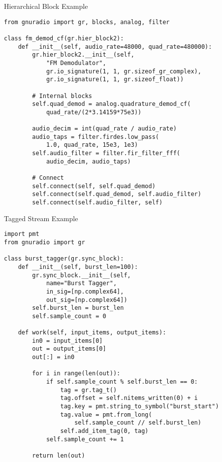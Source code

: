 \documentclass[aspectratio=169,11pt]{beamer}
\begin{document}
\begin{frame}[fragile]{Hierarchical Block Example}
\begin{verbatim}
from gnuradio import gr, blocks, analog, filter

class fm_demod_cf(gr.hier_block2):
    def __init__(self, audio_rate=48000, quad_rate=480000):
        gr.hier_block2.__init__(self,
            "FM Demodulator",
            gr.io_signature(1, 1, gr.sizeof_gr_complex),
            gr.io_signature(1, 1, gr.sizeof_float))
        
        # Internal blocks
        self.quad_demod = analog.quadrature_demod_cf(
            quad_rate/(2*3.14159*75e3))
        
        audio_decim = int(quad_rate / audio_rate)
        audio_taps = filter.firdes.low_pass(
            1.0, quad_rate, 15e3, 1e3)
        self.audio_filter = filter.fir_filter_fff(
            audio_decim, audio_taps)
        
        # Connect
        self.connect(self, self.quad_demod)
        self.connect(self.quad_demod, self.audio_filter)
        self.connect(self.audio_filter, self)
\end{verbatim}
\end{frame}

\begin{frame}[fragile]{Tagged Stream Example}
\begin{verbatim}
import pmt
from gnuradio import gr

class burst_tagger(gr.sync_block):
    def __init__(self, burst_len=100):
        gr.sync_block.__init__(self,
            name="Burst Tagger",
            in_sig=[np.complex64],
            out_sig=[np.complex64])
        self.burst_len = burst_len
        self.sample_count = 0
    
    def work(self, input_items, output_items):
        in0 = input_items[0]
        out = output_items[0]
        out[:] = in0
        
        for i in range(len(out)):
            if self.sample_count % self.burst_len == 0:
                tag = gr.tag_t()
                tag.offset = self.nitems_written(0) + i
                tag.key = pmt.string_to_symbol("burst_start")
                tag.value = pmt.from_long(
                    self.sample_count // self.burst_len)
                self.add_item_tag(0, tag)
            self.sample_count += 1
        
        return len(out)
\end{verbatim}
\end{frame}
\end{document}
